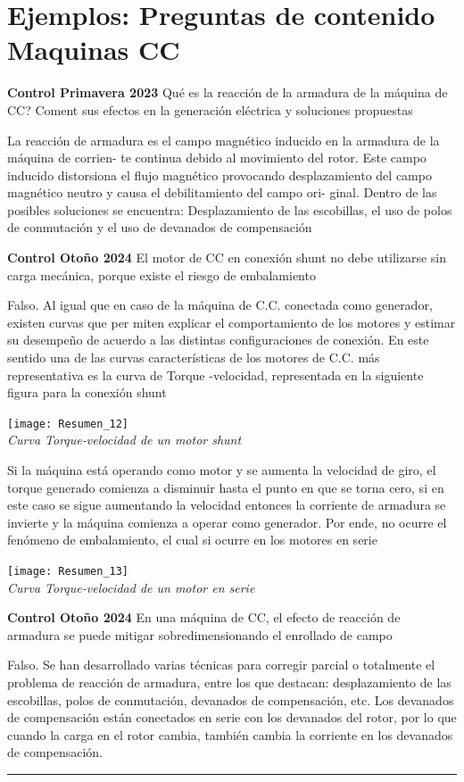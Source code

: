 \documentclass[
  11pt,
  letterpaper,
   addpoints,
   answers
  ]{exam}
\begin{document}
\section*{Ejemplos: Preguntas de contenido Maquinas CC}
\begin{questions}
  \question \textbf{Control Primavera 2023} Qué es la reacción de la armadura de la máquina de CC? Coment sus efectos en la generación eléctrica y soluciones propuestas
  \begin{solution}
    La reacción de armadura es el campo magnético inducido en la armadura de la máquina de corrien- te continua debido al movimiento del rotor. Este campo inducido distorsiona el flujo magnético provocando desplazamiento del campo magnético neutro y causa el debilitamiento del campo ori-
    ginal. Dentro de las posibles soluciones se encuentra: Desplazamiento de las escobillas, el uso de polos de conmutación y el uso de devanados de compensación
  \end{solution}
  \question \textbf{Control Otoño 2024} El motor de CC en conexión shunt no debe utilizarse sin carga mecánica, porque existe el riesgo de embalamiento
  \begin{solution}
    Falso. Al igual que en caso de la máquina de C.C. conectada como generador, existen curvas que per miten explicar el comportamiento de los motores y estimar su desempeño de acuerdo a las distintas configuraciones de conexión. En este sentido una de las curvas características de los motores de C.C. más representativa es la curva de Torque -velocidad, representada en la siguiente figura para la conexión shunt
    \begin{center}
      \texttt{[image: Resumen\_12]} \\
      \textit{Curva Torque-velocidad de un motor shunt}
  \end{center} 
    Si la máquina está operando como motor y se aumenta la velocidad de giro, el torque generado comienza a disminuir hasta el punto en que se torna cero, si en este caso se sigue aumentando la velocidad entonces la corriente de armadura se invierte y la máquina comienza a operar como generador. Por ende, no ocurre el fenómeno de embalamiento, el cual si ocurre en los motores en serie
    \begin{center}
      \texttt{[image: Resumen\_13]} \\
      \textit{Curva Torque-velocidad de un motor en serie}
  \end{center}
    \end{solution}
    \question \textbf{Control Otoño 2024} En una máquina de CC, el efecto de reacción de armadura se puede mitigar sobredimensionando el
    enrollado de campo
    \begin{solution}
      Falso. Se han desarrollado varias técnicas para corregir parcial o totalmente el problema de reacción de armadura, entre los que destacan: desplazamiento de las escobillas, polos de conmutación, devanados de compensación, etc. Los devanados de compensación están conectados en serie con los devanados del rotor, por lo que cuando la carga en el rotor cambia, también cambia la corriente en los devanados de compensación.
  \end{solution}
\end{questions}
\newpage
\hrule 
\end{document}
